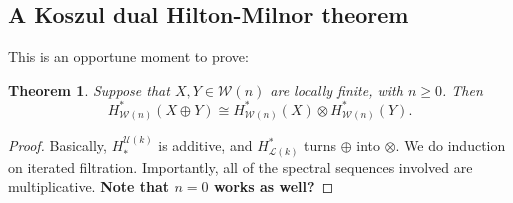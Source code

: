 \documentclass[11pt]{amsart}
\theoremstyle{plain}
\newtheorem{thm}{Theorem}[section]
\theoremstyle{definition}
\newcommand{\calU}{\mathcal{U}}
\newcommand{\calL}{\mathcal{L}}
\newcommand{\calw}{\mathcal{W}}
\theoremstyle{plain}
\begin{document}
\begin{Calculations of HWn for n nonzero}
\subsection{A Koszul dual Hilton-Milnor theorem}
This is an opportune moment to prove:
\begin{thm}\label{Koszul-dual Hilton-Milnor theorem}
Suppose that $X,Y\in\calw(n)$ are locally finite, with $n\geq0$. Then 
\[H^*_{\calw(n)}(X\oplus Y)\cong H^*_{\calw(n)}(X)\otimes H^*_{\calw(n)}(Y).\]
\end{thm}
\begin{proof}
Basically, $H_{*}^{\calU(k)}$ is additive, and $H^*_{\calL(k)}$ turns $\oplus$ into $\otimes $. We do induction on iterated filtration. Importantly, all of the spectral sequences involved are multiplicative. \textbf{Note that $n=0$ works as well?}
\end{proof}


\end{Calculations of HWn for n nonzero}
\end{document}
